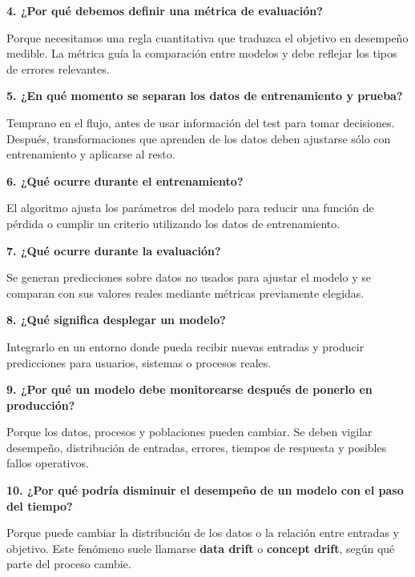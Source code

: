 \documentclass[11pt]{article}
\newcommand{\pregunta}[1]{\vspace{2mm}\textbf{#1}}
\begin{document}
\pregunta{4. ¿Por qué debemos definir una métrica de evaluación?}
\begin{respuesta}
Porque necesitamos una regla cuantitativa que traduzca el objetivo en desempeño medible. La métrica guía la comparación entre modelos y debe reflejar los tipos de errores relevantes.
\end{respuesta}

\pregunta{5. ¿En qué momento se separan los datos de entrenamiento y prueba?}
\begin{respuesta}
Temprano en el flujo, antes de usar información del test para tomar decisiones. Después, transformaciones que aprenden de los datos deben ajustarse sólo con entrenamiento y aplicarse al resto.
\end{respuesta}

\pregunta{6. ¿Qué ocurre durante el entrenamiento?}
\begin{respuesta}
El algoritmo ajusta los parámetros del modelo para reducir una función de pérdida o cumplir un criterio utilizando los datos de entrenamiento.
\end{respuesta}

\pregunta{7. ¿Qué ocurre durante la evaluación?}
\begin{respuesta}
Se generan predicciones sobre datos no usados para ajustar el modelo y se comparan con sus valores reales mediante métricas previamente elegidas.
\end{respuesta}

\pregunta{8. ¿Qué significa desplegar un modelo?}
\begin{respuesta}
Integrarlo en un entorno donde pueda recibir nuevas entradas y producir predicciones para usuarios, sistemas o procesos reales.
\end{respuesta}

\pregunta{9. ¿Por qué un modelo debe monitorearse después de ponerlo en producción?}
\begin{respuesta}
Porque los datos, procesos y poblaciones pueden cambiar. Se deben vigilar desempeño, distribución de entradas, errores, tiempos de respuesta y posibles fallos operativos.
\end{respuesta}

\pregunta{10. ¿Por qué podría disminuir el desempeño de un modelo con el paso del tiempo?}
\begin{respuesta}
Porque puede cambiar la distribución de los datos o la relación entre entradas y objetivo. Este fenómeno suele llamarse \textbf{data drift} o \textbf{concept drift}, según qué parte del proceso cambie.
\end{respuesta}
\end{document}
